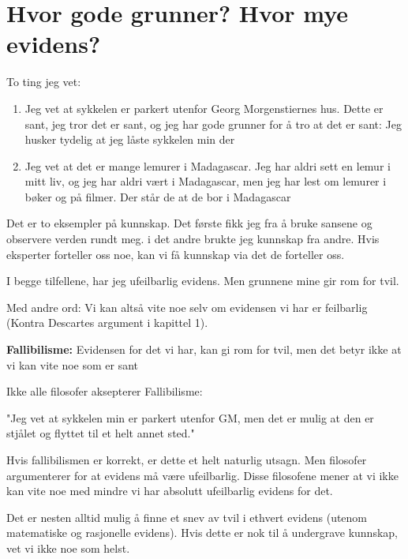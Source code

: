\documentclass[11pt]{article}
\begin{document}
\section{Hvor gode grunner? Hvor mye evidens?}

To ting jeg vet: 

\begin{enumerate}
    \item Jeg vet at sykkelen er parkert utenfor Georg Morgenstiernes hus. Dette er sant, jeg tror det er sant, og jeg har gode grunner for å tro at det er sant: Jeg husker tydelig at jeg låste sykkelen min der
    \item Jeg vet at det er mange lemurer i Madagascar. Jeg har aldri sett en lemur i mitt liv, og jeg har aldri vært i Madagascar, men jeg har lest om lemurer i bøker og på filmer. Der står de at de bor i Madagascar 
\end{enumerate}


Det er to eksempler på kunnskap. Det første fikk jeg fra å bruke sansene og observere verden rundt meg. i det andre brukte jeg kunnskap fra andre. Hvis eksperter forteller oss noe, kan vi få kunnskap via det de forteller oss.

\vspace{1em}
I begge tilfellene, har jeg ufeilbarlig evidens. Men grunnene mine gir rom for tvil.

\vspace{1em}
Med andre ord: Vi kan altså vite noe selv om evidensen vi har er feilbarlig (Kontra Descartes argument i kapittel 1).

\textbf{Fallibilisme:} Evidensen for det vi har, kan gi rom for tvil, men det betyr ikke at vi kan vite noe som er sant


Ikke alle filosofer aksepterer Fallibilisme: 

\vspace{1em}
"Jeg vet at sykkelen min er parkert utenfor GM, men det er mulig at den er stjålet og flyttet til et helt annet sted."


\vspace{1em}
Hvis fallibilismen er korrekt, er dette et helt naturlig utsagn. Men filosofer argumenterer for at evidens må være ufeilbarlig. Disse filosofene mener at vi ikke kan vite noe med mindre vi har absolutt ufeilbarlig evidens for det.

\vspace{1em}
Det er nesten alltid mulig å finne et snev av tvil i ethvert evidens (utenom matematiske og rasjonelle evidens). Hvis dette er nok til å undergrave kunnskap, vet vi ikke noe som helst.
\end{document}
